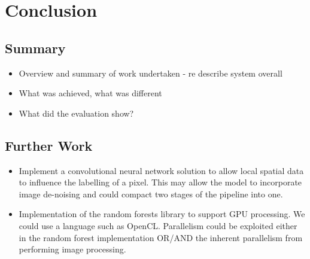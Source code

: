 \documentclass[12pt,twoside,notitlepage]{report}
\begin{document}












\cleardoublepage
\chapter{Conclusion}
  \section{Summary}
        \begin{itemize}
            \item Overview and summary of work undertaken - re describe system overall
            \item What was achieved, what was different
            \item What did the evaluation show?
        \end{itemize}

    \section{Further Work}
        \begin{itemize}
            \item Implement a convolutional neural network solution to allow local spatial data to influence the labelling of a pixel. This may allow the model to incorporate image de-noising and could compact two stages of the pipeline into one.
            \item Implementation of the random forests library to support GPU processing. We could use a language such as OpenCL. Parallelism could be exploited either in the random forest implementation OR/AND the inherent parallelism from performing image processing.
        \end{itemize}
\end{document}
